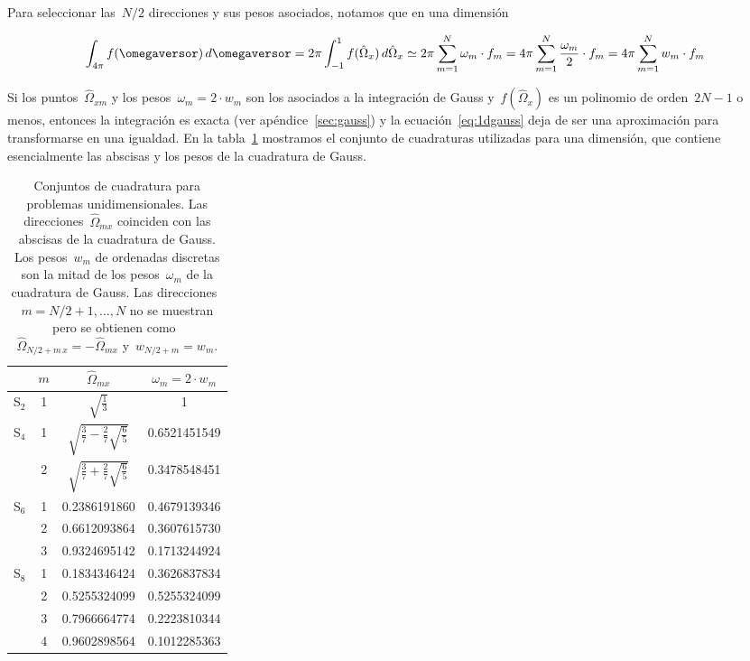 Para seleccionar las~$N/2$ direcciones y sus pesos asociados, notamos que en una dimensión

\begin{equation}\label{eq:1dgauss}
 \int_{4\pi} f(\omegaversor) \, d\omegaversor = 2\pi \int_{-1}^{1} f(\hat{\Omega}_x) \, d\hat{\Omega}_x \simeq 
2\pi \sum_{m=1}^N \omega_m \cdot f_m =
4\pi \sum_{m=1}^N \frac{\omega_m}{2} \cdot f_m =
4\pi \sum_{m=1}^N w_m \cdot f_m
\end{equation}

Si los puntos~$\hat{\Omega}_{xm}$ y los pesos~$\omega_m=2\cdot w_m$ son los asociados a la integración de Gauss y~$f(\hat{\Omega}_x)$ es un polinomio de orden~$2N-1$ o menos, entonces la integración es exacta (ver apéndice~\ref{sec:gauss}) y la ecuación~\eqref{eq:1dgauss} deja de ser una aproximación para transformarse en una igualdad. En la tabla~\ref{tab:gauss1d} mostramos el conjunto de cuadraturas utilizadas para una dimensión, que contiene esencialmente las abscisas y los pesos de la cuadratura de Gauss.

\begin{table}[t]
\begin{center}
\begin{tabular}{cccc}
\hline
\hline
        & $m$ &  $\hat{\Omega}_{mx}$   & $\omega_m = 2 \cdot w_m$ \\
\hline              
  S$_2$ & 1   & $\sqrt{\frac{1}{3}}$   & 1   \\
                     
\hline              
  S$_4$ & 1   & $\sqrt{\frac{3}{7}-\frac{2}{7}\sqrt{\frac{6}{5}}}$ &    0.6521451549   \\
        & 2   & $\sqrt{\frac{3}{7}+\frac{2}{7}\sqrt{\frac{6}{5}}}$ &    0.3478548451   \\

\hline              
  S$_6$ & 1     & 0.2386191860   & 0.4679139346   \\
        & 2     & 0.6612093864   & 0.3607615730   \\
        & 3     & 0.9324695142   & 0.1713244924   \\

\hline              
  S$_8$ & 1     & 0.1834346424  & 0.3626837834   \\
        & 2     & 0.5255324099  & 0.5255324099    \\
        & 3     & 0.7966664774  & 0.2223810344   \\
        & 4     & 0.9602898564  & 0.1012285363   \\
\hline
\hline
\end{tabular}
\end{center}
\caption{\label{tab:gauss1d}Conjuntos de cuadratura para problemas unidimensionales. Las direcciones~$\hat{\Omega}_{mx}$ coinciden con las abscisas de la cuadratura de Gauss. Los pesos~$w_m$ de ordenadas discretas son la mitad de los pesos~$\omega_m$ de la cuadratura de Gauss. Las direcciones~$m=N/2+1,\dots,N$ no se muestran pero se obtienen como~$\hat{\Omega}_{N/2+m \, x} = -\hat{\Omega}_{mx}$ y~$w_{N/2+m} = w_m$.}
\end{table}

